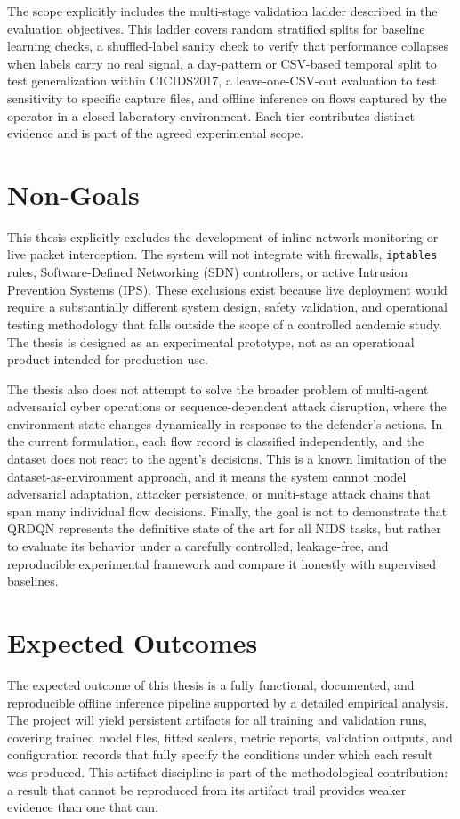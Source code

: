 The scope explicitly includes the multi-stage validation ladder described in the evaluation objectives. This ladder covers random stratified splits for baseline learning checks, a shuffled-label sanity check to verify that performance collapses when labels carry no real signal, a day-pattern or CSV-based temporal split to test generalization within CICIDS2017, a leave-one-CSV-out evaluation to test sensitivity to specific capture files, and offline inference on flows captured by the operator in a closed laboratory environment. Each tier contributes distinct evidence and is part of the agreed experimental scope.

\section{Non-Goals}
This thesis explicitly excludes the development of inline network monitoring or live packet interception. The system will not integrate with firewalls, \texttt{iptables} rules, Software-Defined Networking (SDN) controllers, or active Intrusion Prevention Systems (IPS). These exclusions exist because live deployment would require a substantially different system design, safety validation, and operational testing methodology that falls outside the scope of a controlled academic study. The thesis is designed as an experimental prototype, not as an operational product intended for production use.

The thesis also does not attempt to solve the broader problem of multi-agent adversarial cyber operations or sequence-dependent attack disruption, where the environment state changes dynamically in response to the defender's actions. In the current formulation, each flow record is classified independently, and the dataset does not react to the agent's decisions. This is a known limitation of the dataset-as-environment approach, and it means the system cannot model adversarial adaptation, attacker persistence, or multi-stage attack chains that span many individual flow decisions. Finally, the goal is not to demonstrate that QRDQN represents the definitive state of the art for all NIDS tasks, but rather to evaluate its behavior under a carefully controlled, leakage-free, and reproducible experimental framework and compare it honestly with supervised baselines.

\section{Expected Outcomes}
The expected outcome of this thesis is a fully functional, documented, and reproducible offline inference pipeline supported by a detailed empirical analysis. The project will yield persistent artifacts for all training and validation runs, covering trained model files, fitted scalers, metric reports, validation outputs, and configuration records that fully specify the conditions under which each result was produced. This artifact discipline is part of the methodological contribution: a result that cannot be reproduced from its artifact trail provides weaker evidence than one that can.

